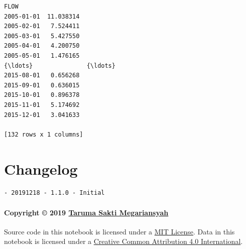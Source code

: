 \documentclass[11pt]{article}
\makeatletter
\newcommand{\boxspacing}{\kern\kvtcb@left@rule\kern\kvtcb@boxsep}
\newcommand{\prompt}[4]{
        \ttfamily\llap{{\color{#2}[#3]:\hspace{3pt}#4}}\vspace{-\baselineskip}
    }
\makeatother
\begin{document}
            \begin{tcolorbox}[breakable, size=fbox, boxrule=.5pt, pad at break*=1mm, opacityfill=0]
\prompt{Out}{outcolor}{0}{\boxspacing}
\begin{Verbatim}[commandchars=\\\{\}]
                 FLOW
2005-01-01  11.038314
2005-02-01   7.524411
2005-03-01   5.427550
2005-04-01   4.200750
2005-05-01   1.476165
{\ldots}               {\ldots}
2015-08-01   0.656268
2015-09-01   0.636015
2015-10-01   0.896378
2015-11-01   5.174692
2015-12-01   3.041633

[132 rows x 1 columns]
\end{Verbatim}
\end{tcolorbox}
        
    \hypertarget{changelog}{%
\section{Changelog}\label{changelog}}

\begin{verbatim}
- 20191218 - 1.1.0 - Initial
\end{verbatim}

\hypertarget{copyright-2019-taruma-sakti-megariansyah}{%
\paragraph{\texorpdfstring{Copyright © 2019
\href{https://taruma.github.io}{Taruma Sakti
Megariansyah}}{Copyright © 2019 Taruma Sakti Megariansyah}}\label{copyright-2019-taruma-sakti-megariansyah}}

Source code in this notebook is licensed under a
\href{https://choosealicense.com/licenses/mit/}{MIT License}. Data in
this notebook is licensed under a
\href{https://creativecommons.org/licenses/by/4.0/}{Creative Common
Attribution 4.0 International}.


    
    
    
\end{document}
